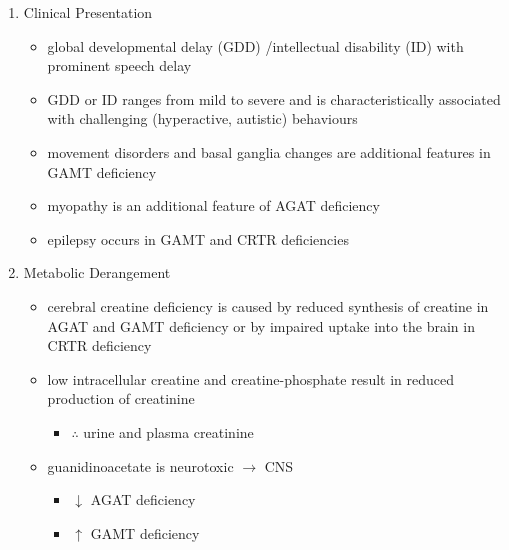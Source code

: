 \documentclass{scrartcl}
\begin{document}
\begin{enumerate}
\item Clinical Presentation
\label{sec:orgc983698}
\begin{itemize}
\item global developmental delay (GDD) /intellectual disability (ID) with
prominent speech delay
\item GDD or ID ranges from mild to severe and is characteristically
associated with challenging (hyperactive, autistic) behaviours
\item movement disorders and basal ganglia changes are additional features
in GAMT deficiency
\item myopathy is an additional feature of AGAT deficiency
\item epilepsy occurs in GAMT and CRTR deficiencies
\end{itemize}

\item Metabolic Derangement
\label{sec:org4f38a3c}
\begin{itemize}
\item cerebral creatine deficiency is caused by reduced synthesis of
creatine in AGAT and GAMT deficiency or by impaired uptake into the
brain in CRTR deficiency
\item low intracellular creatine and creatine-phosphate result in reduced
production of creatinine
\begin{itemize}
\item \(\therefore\) \low urine and plasma creatinine
\end{itemize}
\item guanidinoacetate is neurotoxic \(\to\) CNS
\begin{itemize}
\item \(\downarrow\) AGAT deficiency
\item \(\uparrow\) GAMT deficiency
\end{itemize}
\end{itemize}


\end{enumerate}
\end{document}
